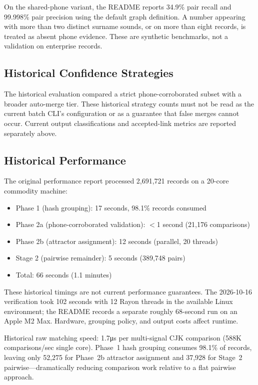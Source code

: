 \documentclass{article}
\begin{document}
On the shared-phone variant, the README reports 34.9\% pair recall and 99.998\% pair precision using the default graph definition. A number appearing with more than two distinct surname sounds, or on more than eight records, is treated as absent phone evidence. These are synthetic benchmarks, not a validation on enterprise records.

\subsection{Historical Confidence Strategies}

The historical evaluation compared a strict phone-corroborated subset with a broader auto-merge tier. These historical strategy counts must not be read as the current batch CLI's configuration or as a guarantee that false merges cannot occur. Current output classifications and accepted-link metrics are reported separately above.

\subsection{Historical Performance}

The original performance report processed 2,691,721 records on a 20-core commodity machine:

\begin{itemize}
\tightlist
\item Phase 1 (hash grouping): 17 seconds, 98.1\% records consumed
\item Phase 2a (phone-corroborated validation): $<$1 second (21,176 comparisons)
\item Phase 2b (attractor assignment): 12 seconds (parallel, 20 threads)
\item Stage 2 (pairwise remainder): 5 seconds (389,748 pairs)
\item Total: 66 seconds (1.1 minutes)
\end{itemize}

These historical timings are not current performance guarantees. The 2026-10-16 verification took 102 seconds with 12 Rayon threads in the available Linux environment; the README records a separate roughly 68-second run on an Apple M2 Max. Hardware, grouping policy, and output costs affect runtime.

Historical raw matching speed: 1.7μs per multi-signal CJK comparison (588K comparisons/sec single core). Phase~1 hash grouping consumes 98.1\% of records, leaving only 52,275 for Phase~2b attractor assignment and 37,928 for Stage~2 pairwise—dramatically reducing comparison work relative to a flat pairwise approach.
\end{document}
